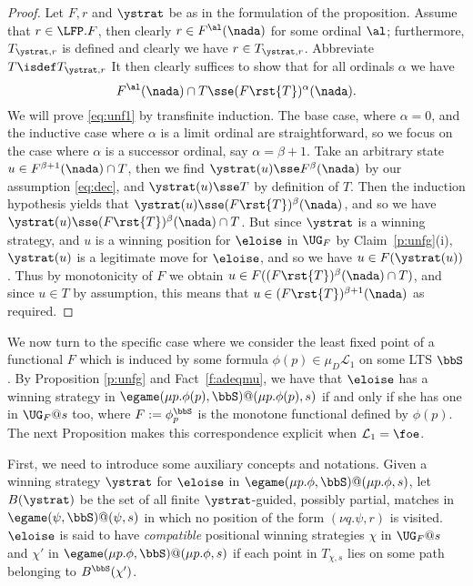 \begin{proof}
Let $F,r$ and $\ystrat$ be as in the formulation of the proposition.
Assume that $r \in \LFP. F$, then clearly $r \in F^{\al}(\nada)$ for some 
ordinal $\al$; furthermore, $T_{\ystrat,r}$ is defined and clearly we have 
$r \in T_{\ystrat,r}$.
Abbreviate $T \isdef T_{\ystrat,r}$
It then clearly suffices to show that for all ordinals $\alpha$ we have
\begin{equation}
\label{eq:unf1}
F^{\al}(\nada) \cap T \sse (F\rst{T})^{\alpha}(\nada).
\end{equation}
We will prove \eqref{eq:unf1} by transfinite induction.
The base case, where $\alpha = 0$, and the inductive case where $\alpha$ is a 
limit ordinal are straightforward, so we focus on the case where $\alpha$ is a 
successor ordinal, say $\alpha = \beta +1$.
Take an arbitrary state $u \in F^{\beta+1}(\nada) \cap T$, then we 
find $\ystrat(u) \sse F^{\beta}(\nada)$ by our assumption \eqref{eq:dec}, and 
$\ystrat(u) \sse T$ by definition of $T$.
Then the induction hypothesis yields that 
$\ystrat(u) \sse (F\rst{T})^{\beta}(\nada)$, and so we have 
$\ystrat(u) \sse (F\rst{T})^{\beta}(\nada) \cap T$.
But since $\ystrat$ is a winning strategy, and $u$ is a winning position for 
$\eloise$ in $\UG_{F}$ by Claim~\ref{p:unfg}(i), $\ystrat(u)$ is a
legitimate move for $\eloise$, and so we have $u \in F(\ystrat(u))$.
Thus by monotonicity of $F$ we obtain $u \in 
F((F\rst{T})^{\beta}(\nada) \cap T)$, and since $u \in T$ 
by assumption, this means that $u \in (F\rst{T})^{\beta+1}(\nada)$ as 
required.
\end{proof}

We now turn to the specific case where we consider the least fixed point of a 
functional $F$ which is induced by some formula $\phi(p) \in 
\mu_{D}\mathcal{L}_1$ on some LTS $\bbS$.   
By Proposition \ref{p:unfg} and Fact~\ref{f:adeqmu}, we have that $\eloise$ has
a winning strategy in  $\egame(\mu p.\phi(p),\bbS)@(\mu p.\phi(p),s)$ if and only if she has one in $\UG_{F}@s$ too, where $F := \phi_{p}^{\bbS}$ is the monotone functional defined by $\phi(p)$. The next Proposition  makes this correspondence explicit when $\mathcal{L}_1=\foe$. 

First, we need to introduce some auxiliary concepts and notations.
Given  a winning strategy   $\ystrat$ for $\eloise$ in $\egame(\mu p. \phi,\bbS)@(\mu p. \phi,s)$, 
let $B(\ystrat)$ be the set of all finite $\ystrat$-guided, possibly partial, 
matches in  $\egame(\psi,\bbS)@(\psi,s)$ in which no position of the form 
$(\nu q. \psi, r)$ is visited. 
$\eloise$ is said to have \emph{compatible} positional winning strategies
$\chi$ in $\UG_F@s$ and  $\chi'$  in $\egame(\mu p.\phi,\bbS)@(\mu p.\phi,s)$ if
each point in $T_{\chi,s}$ lies on some path belonging to $B^\bbS(\chi')$. 

